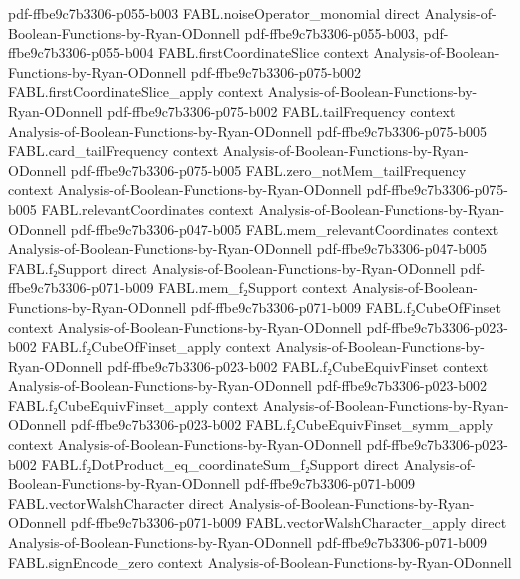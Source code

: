 \begin{theorem}
{    pdf-ffbe9c7b3306-p055-b003}
\proofstep
  {FABL.noiseOperator_monomial}
  {direct}
  {Analysis-of-Boolean-Functions-by-Ryan-ODonnell}
  {pdf-ffbe9c7b3306-p055-b003,
    pdf-ffbe9c7b3306-p055-b004}
\proofstep
  {FABL.firstCoordinateSlice}
  {context}
  {Analysis-of-Boolean-Functions-by-Ryan-ODonnell}
  {pdf-ffbe9c7b3306-p075-b002}
\proofstep
  {FABL.firstCoordinateSlice_apply}
  {context}
  {Analysis-of-Boolean-Functions-by-Ryan-ODonnell}
  {pdf-ffbe9c7b3306-p075-b002}
\proofstep
  {FABL.tailFrequency}
  {context}
  {Analysis-of-Boolean-Functions-by-Ryan-ODonnell}
  {pdf-ffbe9c7b3306-p075-b005}
\proofstep
  {FABL.card_tailFrequency}
  {context}
  {Analysis-of-Boolean-Functions-by-Ryan-ODonnell}
  {pdf-ffbe9c7b3306-p075-b005}
\proofstep
  {FABL.zero_notMem_tailFrequency}
  {context}
  {Analysis-of-Boolean-Functions-by-Ryan-ODonnell}
  {pdf-ffbe9c7b3306-p075-b005}
\proofstep
  {FABL.relevantCoordinates}
  {context}
  {Analysis-of-Boolean-Functions-by-Ryan-ODonnell}
  {pdf-ffbe9c7b3306-p047-b005}
\proofstep
  {FABL.mem_relevantCoordinates}
  {context}
  {Analysis-of-Boolean-Functions-by-Ryan-ODonnell}
  {pdf-ffbe9c7b3306-p047-b005}
\proofstep
  {FABL.f₂Support}
  {direct}
  {Analysis-of-Boolean-Functions-by-Ryan-ODonnell}
  {pdf-ffbe9c7b3306-p071-b009}
\proofstep
  {FABL.mem_f₂Support}
  {context}
  {Analysis-of-Boolean-Functions-by-Ryan-ODonnell}
  {pdf-ffbe9c7b3306-p071-b009}
\proofstep
  {FABL.f₂CubeOfFinset}
  {context}
  {Analysis-of-Boolean-Functions-by-Ryan-ODonnell}
  {pdf-ffbe9c7b3306-p023-b002}
\proofstep
  {FABL.f₂CubeOfFinset_apply}
  {context}
  {Analysis-of-Boolean-Functions-by-Ryan-ODonnell}
  {pdf-ffbe9c7b3306-p023-b002}
\proofstep
  {FABL.f₂CubeEquivFinset}
  {context}
  {Analysis-of-Boolean-Functions-by-Ryan-ODonnell}
  {pdf-ffbe9c7b3306-p023-b002}
\proofstep
  {FABL.f₂CubeEquivFinset_apply}
  {context}
  {Analysis-of-Boolean-Functions-by-Ryan-ODonnell}
  {pdf-ffbe9c7b3306-p023-b002}
\proofstep
  {FABL.f₂CubeEquivFinset_symm_apply}
  {context}
  {Analysis-of-Boolean-Functions-by-Ryan-ODonnell}
  {pdf-ffbe9c7b3306-p023-b002}
\proofstep
  {FABL.f₂DotProduct_eq_coordinateSum_f₂Support}
  {direct}
  {Analysis-of-Boolean-Functions-by-Ryan-ODonnell}
  {pdf-ffbe9c7b3306-p071-b009}
\proofstep
  {FABL.vectorWalshCharacter}
  {direct}
  {Analysis-of-Boolean-Functions-by-Ryan-ODonnell}
  {pdf-ffbe9c7b3306-p071-b009}
\proofstep
  {FABL.vectorWalshCharacter_apply}
  {direct}
  {Analysis-of-Boolean-Functions-by-Ryan-ODonnell}
  {pdf-ffbe9c7b3306-p071-b009}
\proofstep
  {FABL.signEncode_zero}
  {context}
  {Analysis-of-Boolean-Functions-by-Ryan-ODonnell}

\end{theorem}
